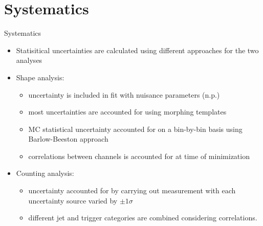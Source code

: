 \section{Systematics}

\begin{frame}{Systematics}

    \begin{itemize}
        \smaller
        \item Statisitical uncertainties are calculated using different approaches for the two
            analyses
        \item Shape analysis:
        \begin{itemize}
            \smaller
            \item uncertainty is included in fit with nuisance parameters (n.p.)
            \item most uncertainties are accounted for using morphing templates
            \item MC statistical uncertainty accounted for on a bin-by-bin basis using Barlow-Beeston
                approach
            \item correlations between channels is accounted for at time of minimization
        \end{itemize}
        \item Counting analysis:
        \begin{itemize}
            \smaller
            \item uncertainty accounted for by carrying out measurement with each uncertainty source
                varied by $\pm 1\sigma$
            \item different jet and trigger categories are combined considering correlations.
        \end{itemize}
    \end{itemize}

\end{frame}


